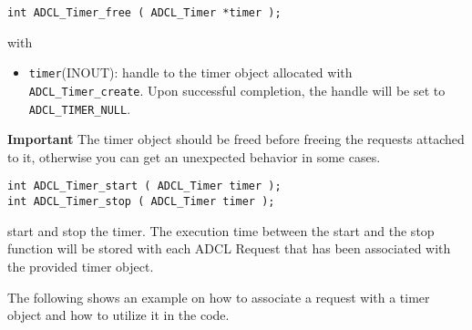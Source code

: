 \begin{verbatim}
int ADCL_Timer_free ( ADCL_Timer *timer );
\end{verbatim}
with
\begin{itemize}
\item {\tt timer}(INOUT): handle to the timer object allocated with {\tt
  ADCL\_Timer\-\_create}.  Upon successful completion, the handle will be set
  to {\tt ADCL\_TIMER\_NULL}.
\end{itemize}

\textbf{Important} The timer object should be freed before freeing the
requests attached to it, otherwise you can get an unexpected behavior in some cases.

\begin{verbatim}
int ADCL_Timer_start ( ADCL_Timer timer );
int ADCL_Timer_stop ( ADCL_Timer timer );
\end{verbatim}
start and stop the timer. The execution time between the start and the stop
function will be stored with each ADCL Request that has been associated with
the provided timer object.


The following shows an example on how to associate a request with a timer
object and how to utilize it in the code.

